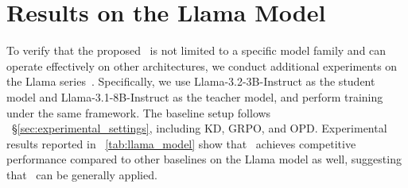 \newpage
\section{Results on the Llama Model}
\label{app:other_model}

\begin{table}[ht]
\centering
\caption{
Comparison with other baselines on mathematical reasoning benchmarks using a Llama series model. \method~achieves competitive performance across benchmarks. \textbf{Bold} indicates the best performance and \underline{underline} indicates second-best.
}
\label{tab:llama_model}
\end{table}
{To verify that the proposed \method~is not limited to a specific model family and can operate effectively on other architectures, we conduct additional experiments on the Llama series~\cite{grattafiori2024llama}. Specifically, we use Llama-3.2-3B-Instruct as the student model and Llama-3.1-8B-Instruct as the teacher model, and perform training under the same framework.
The baseline setup follows ~\S\ref{sec:experimental_settings}, including KD, GRPO, and OPD.
Experimental results reported in ~\autoref{tab:llama_model} show that \method~achieves competitive performance compared to other baselines on the Llama model as well, suggesting that \method~can be generally applied.}

